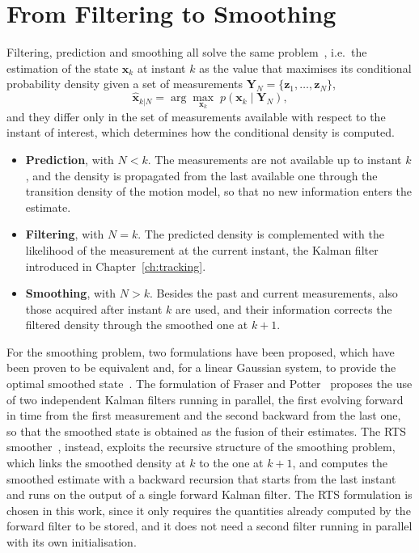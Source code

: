 \section{From Filtering to Smoothing}
\label{sec:rts_problem}

Filtering, prediction and smoothing all solve the same problem~\cite{sarkka2013book}, i.e.\ the estimation of the
state $\mathbf{x}_k$ at instant $k$ as the value that maximises its conditional probability
density given a set of measurements $\mathbf{Y}_N = \{\mathbf{z}_1, \dots, \mathbf{z}_N\}$,
\begin{equation}
    \hat{\mathbf{x}}_{k|N} = \arg\max_{\mathbf{x}_k}\; p\left(\mathbf{x}_k \mid \mathbf{Y}_N\right),
    \label{eq:rts_map}
\end{equation}
and they differ only in the set of measurements available with respect to the instant of
interest, which determines how the conditional density is computed.
\begin{itemize}
    \item \textbf{Prediction}, with $N < k$. The measurements are not available up to
    instant $k$, and the density is propagated from the last available one through the
    transition density of the motion model, so that no new information enters the estimate.
    \item \textbf{Filtering}, with $N = k$. The predicted density is complemented with the
    likelihood of the measurement at the current instant,  the Kalman filter
    introduced in Chapter~\ref{ch:tracking}.
    \item \textbf{Smoothing}, with $N > k$. Besides the past and current measurements, also those acquired after instant $k$ are used,
and their information corrects the filtered density through the smoothed one at $k+1$.
\end{itemize}

For the smoothing problem, two formulations have been proposed, which have been proven to
be equivalent and, for a linear Gaussian system, to provide the optimal smoothed state~\cite{sarkka2013book}. The
formulation of Fraser and Potter~\cite{fraser1969} proposes the use of two independent Kalman filters running
in parallel, the first evolving forward in time from the first measurement and the second
backward from the last one, so that the smoothed state is obtained as the fusion of their
estimates. The RTS smoother~\cite{rauch1965}, instead,
exploits the recursive structure of the smoothing problem, which links the smoothed density
at $k$ to the one at $k+1$, and computes the smoothed estimate with a backward
recursion that starts from the last instant and runs on the output of a single forward
Kalman filter. The RTS formulation is chosen in this work, since it only requires the
quantities already computed by the forward filter to be stored, and it does not need a
second filter running in parallel with its own initialisation.

